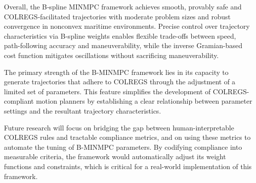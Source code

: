 Overall, the B‐spline MINMPC framework achieves smooth, provably safe and COLREGS‐facilitated trajectories with moderate problem sizes and robust convergence in nonconvex maritime environments. Precise control over trajectory characteristics via B-spline weights enables flexible trade-offs between speed, path-following accuracy and maneuverability, while the inverse Gramian-based cost function mitigates oscillations without sacrificing maneuverability.

The primary strength of the B-MINMPC framework lies in its capacity to generate trajectories that adhere to COLREGS through the adjustment of a limited set of parameters. This feature simplifies the development of COLREGS-compliant motion planners by establishing a clear relationship between parameter settings and the resultant trajectory characteristics. 

Future research will focus on bridging the gap between human-interpretable COLREGS rules and tractable compliance metrics, and on using these metrics to automate the tuning of B-MINMPC parameters. By codifying compliance into measurable criteria, the framework would automatically adjust its weight functions and constraints, which is critical for a real-world implementation of this framework.